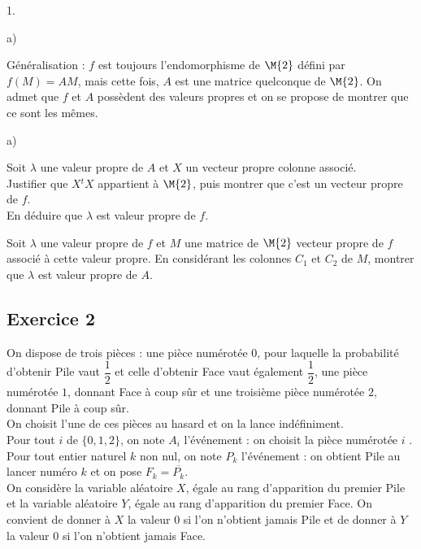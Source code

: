 \begin{noliste}{1.}
\begin{noliste}{a)}
    
  \end{noliste}




\item Généralisation : $f$ est toujours l'endomorphisme de $\M{2}$
  défini par $f(M) = AM$, mais cette fois, $A$ est une matrice
  quelconque de $\M{2}$. On admet que $f$ et $A$ possèdent des valeurs
  propres et on se propose de montrer que ce sont les mêmes.
  \begin{noliste}{a)}
    \setlength{\itemsep}{2mm}
  \item Soit $\lambda$ une valeur propre de $A$ et $X$ un vecteur
    propre colonne associé.\\
    Justifier que $X {}^tX$ appartient à $\M{2}$, puis montrer que
    c'est un vecteur propre de $f$.\\
    En déduire que $\lambda$ est valeur propre de $f$.

    

  \item Soit $\lambda$ une valeur propre de $f$ et $M$ une matrice de
    $\M{2}$ vecteur propre de $f$ associé à cette valeur propre. En
    considérant les colonnes $C_1$ et $C_2$ de $M$, montrer que
    $\lambda$ est valeur propre de $A$.

    
  \end{noliste}
\end{noliste}




\subsection*{Exercice 2}

\noindent
On dispose de trois pièces : une pièce numérotée $0$, pour laquelle la
probabilité d'obtenir Pile vaut $\dfrac{1}{2}$ et celle d'obtenir Face
vaut également $\dfrac{1}{2}$, une pièce numérotée $1$, donnant Face à
coup sûr et une troisième pièce numérotée $2$, donnant Pile à coup
sûr.\\
On choisit l'une de ces pièces au hasard et on la lance
indéfiniment.\\
Pour tout $i$ de $\{0, 1, 2\}$, on note $A_i$ l'événement : \og on
choisit la pièce numérotée $i$ \fg{}.\\
Pour tout entier naturel $k$ non nul, on note $P_k$ l'événement : \og
on obtient Pile au lancer numéro $k$ \fg{} et on pose $F_k =
\overline{P_k}$.\\
On considère la variable aléatoire $X$, égale au rang d'apparition du
premier Pile et la variable aléatoire $Y$, égale au rang d'apparition
du premier Face. On convient de donner à $X$ la valeur $0$ si l'on
n'obtient jamais Pile et de donner à $Y$ la valeur $0$ si l'on
n'obtient jamais Face.


